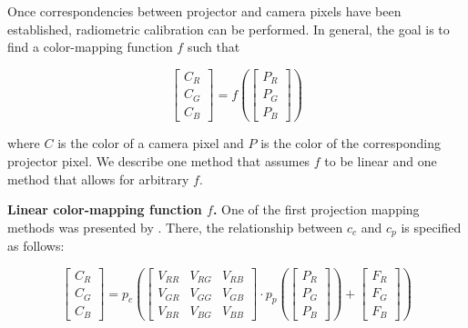 Once correspondencies between projector and camera pixels have been established, radiometric calibration can be performed. In general, the goal is to find a color-mapping function \(f\) such that

\begin{equation}
    \label{eq:radiometric_calibration}
    \begin{bmatrix}
        C_R \\
        C_G \\
        C_B
    \end{bmatrix} = f(
        \begin{bmatrix}
            P_R \\
            P_G \\
            P_B
        \end{bmatrix}
    )
\end{equation}

where \(C\) is the color of a camera pixel and \(P\) is the color of the corresponding projector pixel. We describe one method that assumes \(f\) to be linear and one method that allows for arbitrary \(f\).

\textbf{Linear color-mapping function \(f\).} One of the first projection mapping methods was presented by \citet{Grossberg2004}. There, the relationship between \(c_c\) and \(c_p\) is specified as follows:

\begin{equation}
    \label{eq:linear_color_mapping}
    \begin{bmatrix}
        C_R \\
        C_G \\
        C_B
    \end{bmatrix} = p_c(
        \begin{bmatrix}
            V_{RR} & V_{RG} & V_{RB} \\
            V_{GR} & V_{GG} & V_{GB} \\
            V_{BR} & V_{BG} & V_{BB}
        \end{bmatrix} \cdot p_p(
            \begin{bmatrix}
                P_R \\
                P_G \\
                P_B
            \end{bmatrix}
        ) +
        \begin{bmatrix}
            F_R \\
            F_G \\
            F_B
        \end{bmatrix}
    )
\end{equation}

